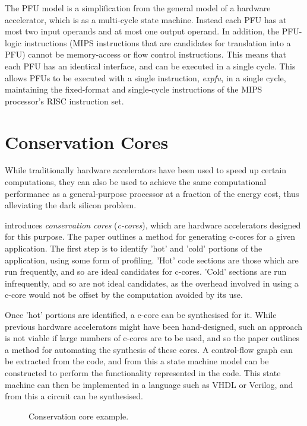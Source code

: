 \documentclass{UoYCSproject}
\begin{document}
The PFU model is a simplification from the general model of a hardware accelerator, which is as a multi-cycle state machine.
Instead each PFU has at most two input operands and at most one output operand. In addition, the PFU-logic instructions (MIPS
instructions that are candidates for translation into a PFU) cannot be memory-access or flow control instructions. This means
that each PFU has an identical interface, and can be executed in a single cycle. This allows PFUs to be executed with a single
instruction, \textit{expfu}, in a single cycle, maintaining the fixed-format and single-cycle instructions of the MIPS
processor's RISC instruction set.

\section{Conservation Cores}

While traditionally hardware accelerators have been used to speed up certain computations, they can also be used to achieve the
same computational performance as a general-purpose processor at a fraction of the energy cost, thus alleviating the dark silicon
problem.

\cite{c-cores} introduces \textit{conservation cores} (\textit{c-cores}), which are hardware accelerators
designed for this purpose. The paper outlines a method for generating c-cores for a given application.
The first step is to identify 'hot' and 'cold' portions of the application, using some form of profiling.
'Hot' code sections are those which are run frequently, and so are ideal candidates for c-cores. 'Cold' sections
are run infrequently, and so are not ideal candidates, as the overhead involved in using a c-core would
not be offset by the computation avoided by its use.

Once 'hot' portions are identified, a c-core can be synthesised for it. While previous hardware accelerators
might have been hand-designed, such an approach is not viable if large numbers of c-cores are to be used, and so
the paper outlines a method for automating the synthesis of these cores. A control-flow graph can be extracted
from the code, and from this a state machine model can be constructed to perform the functionality represented
in the code. This state machine can then be implemented in a language such as VHDL or Verilog, and from this a circuit
can be synthesised.

\begin{figure}[h]
\caption{Conservation core example. \cite{c-cores}}
\end{figure}
\end{document}
